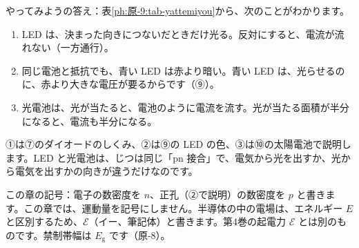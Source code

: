 \noindent やってみようの答え：表\ref{ph:原-9:tab-yattemiyou}から、次のことがわかります。
\begin{enumerate}[label={\bkcircled{\arabic*}}, leftmargin=2.4\zw, itemsep=1pt, topsep=2pt]
\item LED は、決まった向きにつないだときだけ光る。反対にすると、電流が流れない（一方通行）。
\item 同じ電池と抵抗でも、青い LED は赤より暗い。青い LED は、光らせるのに、赤より大きな電圧が要るからです（⑨）。
\item 光電池は、光が当たると、電池のように電流を流す。光が当たる面積が半分になると、電流も半分になる。
\end{enumerate}
①は⑦のダイオードのしくみ、②は⑨の LED の色、③は⑩の太陽電池で説明します。LED と光電池は、じつは同じ「pn 接合」で、電気から光を出すか、光から電気を出すかの向きが違うだけなのです。

\begin{omoidasou}
\end{omoidasou}

\noindent この章の記号：電子の数密度を $n$、正孔（②で説明）の数密度を $p$ と書きます。この章では、運動量を記号にしません。半導体の中の電場は、エネルギー $E$ と区別するため、$\mathcal E$（イー、筆記体）と書きます。第4巻の起電力 $\mathcal E$ とは別のものです。禁制帯幅は $E_{\mathrm g}$ です（原-8）。



